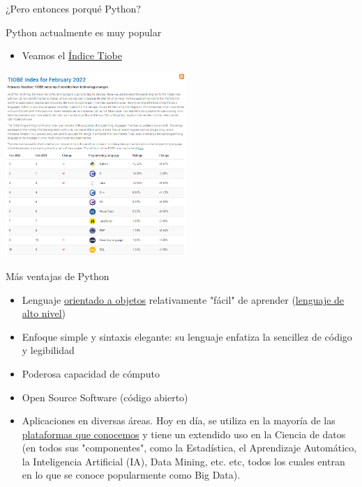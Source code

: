 \documentclass{beamer}
\begin{document}
\begin{frame}{¿Pero entonces porqué Python?} \pause
\begin{block}{Python actualmente es muy popular}  \pause
	\begin{itemize}
		\item Veamos el \textcolor{blue}{\href{https://www.tiobe.com/tiobe-index/}{Índice Tiobe}}
	\end{itemize}
\end{block}
\begin{center}
\includegraphics[height=7cm, scale=0.5]{recursos/tiobe_index22.png}
\end{center}
\end{frame}

\begin{frame}{Más ventajas de Python} \pause
\begin{itemize}
	\item Lenguaje \textcolor{blue}{\href{https://www.computerweekly.com/es/definicion/Programacion-orientada-a-objetos-OOP}{orientado a objetos}} relativamente "fácil" de aprender (\textcolor{blue}{\href{https://www.diarlu.com/lenguajes-de-programacion/}{lenguaje de alto nivel}}) \pause
	\item Enfoque simple y sintaxis elegante: su lenguaje enfatiza la sencillez de código y legibilidad \pause
	\item Poderosa capacidad de cómputo \pause
	\item Open Source Software (código abierto) \pause	
	\item Aplicaciones en diversas áreas. Hoy en día, se utiliza en la mayoría de las \textcolor{blue}{\href{https://learn.onemonth.com/es/10-paginas-web-famosas-hechas-con-python/}{plataformas que conocemos}} y tiene un extendido uso en la Ciencia de datos (en todos sus "componentes", como la Estadística, el Aprendizaje Automático, la Inteligencia Artificial (IA), Data Mining, etc. etc, todos los cuales entran en lo que se conoce popularmente como Big Data).
\end{itemize}
\end{frame}
\end{document}

